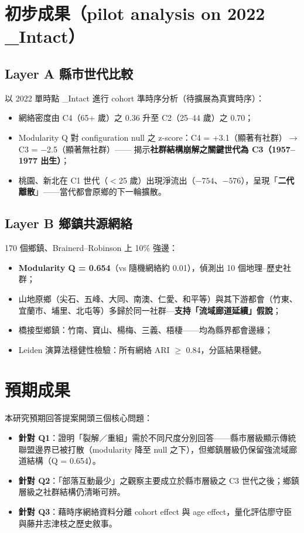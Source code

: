 \documentclass[11pt,a4paper]{article}
\begin{document}
\section{初步成果（pilot analysis on 2022 \_Intact）}

\subsection*{Layer A 縣市世代比較}
以 2022 單時點 \_Intact 進行 cohort 準時序分析（待擴展為真實時序）：
\begin{itemize}
\item 網絡密度由 C4（65+ 歲）之 0.36 升至 C2（25--44 歲）之 0.70；
\item Modularity Q 對 configuration null 之 z-score：C4 = +3.1（顯著有社群）$\to$ C3 = $-$2.5（顯著無社群）—— 揭示\textbf{社群結構崩解之關鍵世代為 C3（1957--1977 出生）}；
\item 桃園、新北在 C1 世代（$<$25 歲）出現淨流出（$-754$、$-576$），呈現「\textbf{二代離散}」——當代都會原鄉的下一輪擴散。
\end{itemize}

\subsection*{Layer B 鄉鎮共源網絡}
170 個鄉鎮、Brainerd--Robinson 上 10\% 強邊：
\begin{itemize}
\item \textbf{Modularity Q = 0.654}（vs 隨機網絡約 0.01），偵測出 10 個地理--歷史社群；
\item 山地原鄉（尖石、五峰、大同、南澳、仁愛、和平等）與其下游都會（竹東、宜蘭市、埔里、北屯等）多歸於同一社群—\textbf{支持「流域廊道延續」假說}；
\item 橋接型鄉鎮：竹南、寶山、楊梅、三義、梧棲——均為縣界都會邊緣；
\item Leiden 演算法穩健性檢驗：所有網絡 ARI $\geq$ 0.84，分區結果穩健。
\end{itemize}

\section{預期成果}
本研究預期回答提案開頭三個核心問題：
\begin{itemize}
\item \textbf{針對 Q1}：證明「裂解／重組」需於不同尺度分別回答——縣市層級顯示傳統聯盟邊界已被打散（modularity 降至 null 之下），但鄉鎮層級仍保留強流域廊道結構（Q = 0.654）。
\item \textbf{針對 Q2}：「部落互動最少」之觀察主要成立於縣市層級之 C3 世代之後；鄉鎮層級之社群結構仍清晰可辨。
\item \textbf{針對 Q3}：藉時序網絡資料分離 cohort effect 與 age effect，量化評估廖守臣與藤井志津枝之歷史敘事。
\end{itemize}
\end{document}
